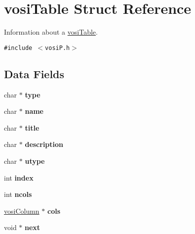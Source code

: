 \hypertarget{structvosiTable}{
\section{vosiTable Struct Reference}
\label{structvosiTable}
}
Information about a \hyperlink{structvosiTable}{vosiTable}.  


{\tt \#include $<$vosiP.h$>$}

\subsection*{Data Fields}
\begin{CompactItemize}
\item 
\hypertarget{structvosiTable_74585b234f8f3310963d234cc5dc4b1c}{
char $\ast$ \textbf{type}}
\label{structvosiTable_74585b234f8f3310963d234cc5dc4b1c}

\item 
\hypertarget{structvosiTable_7dba616a2dcf12879bb31d76b3c681ef}{
char $\ast$ \textbf{name}}
\label{structvosiTable_7dba616a2dcf12879bb31d76b3c681ef}

\item 
\hypertarget{structvosiTable_f171abb103476077cbef37da0afd91d9}{
char $\ast$ \textbf{title}}
\label{structvosiTable_f171abb103476077cbef37da0afd91d9}

\item 
\hypertarget{structvosiTable_c7432ca7613b74a4457a94d72c187ce5}{
char $\ast$ \textbf{description}}
\label{structvosiTable_c7432ca7613b74a4457a94d72c187ce5}

\item 
\hypertarget{structvosiTable_a37ee73afa0782ccad8a86fa9d461071}{
char $\ast$ \textbf{utype}}
\label{structvosiTable_a37ee73afa0782ccad8a86fa9d461071}

\item 
\hypertarget{structvosiTable_894ac75094ae13de7492ee6ff9d1e424}{
int \textbf{index}}
\label{structvosiTable_894ac75094ae13de7492ee6ff9d1e424}

\item 
\hypertarget{structvosiTable_ad97ec1d5ba4c5ac476bef46328f0693}{
int \textbf{ncols}}
\label{structvosiTable_ad97ec1d5ba4c5ac476bef46328f0693}

\item 
\hypertarget{structvosiTable_66cc0405e8693a6fbe1aea251e4507ef}{
\hyperlink{structvosiColumn}{vosiColumn} $\ast$ \textbf{cols}}
\label{structvosiTable_66cc0405e8693a6fbe1aea251e4507ef}

\item 
\hypertarget{structvosiTable_891dd7c1ab0429d37062198a23958c86}{
void $\ast$ \textbf{next}}
\label{structvosiTable_891dd7c1ab0429d37062198a23958c86}

\end{CompactItemize}


